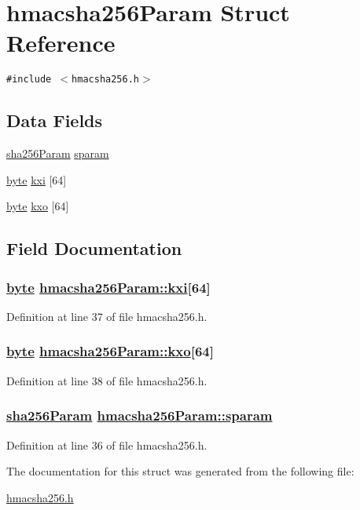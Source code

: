 \hypertarget{structhmacsha256Param}{
\section{hmacsha256Param Struct Reference}
\label{structhmacsha256Param}
}
{\tt \#include $<$hmacsha256.h$>$}

\subsection*{Data Fields}
\begin{CompactItemize}
\item 
\hyperlink{structsha256Param}{sha256Param} \hyperlink{structhmacsha256Param_o0}{sparam}
\item 
\hyperlink{beecrypt_8api_8h_a3}{byte} \hyperlink{structhmacsha256Param_o1}{kxi} \mbox{[}64\mbox{]}
\item 
\hyperlink{beecrypt_8api_8h_a3}{byte} \hyperlink{structhmacsha256Param_o2}{kxo} \mbox{[}64\mbox{]}
\end{CompactItemize}


\subsection{Field Documentation}
\hypertarget{structhmacsha256Param_o1}{
\subsubsection[kxi]{\setlength{\rightskip}{0pt plus 5cm}\hyperlink{beecrypt_8api_8h_a3}{byte} \hyperlink{structhmacsha256Param_o1}{hmacsha256Param::kxi}\mbox{[}64\mbox{]}}}
\label{structhmacsha256Param_o1}


Definition at line 37 of file hmacsha256.h.\hypertarget{structhmacsha256Param_o2}{
\subsubsection[kxo]{\setlength{\rightskip}{0pt plus 5cm}\hyperlink{beecrypt_8api_8h_a3}{byte} \hyperlink{structhmacsha256Param_o2}{hmacsha256Param::kxo}\mbox{[}64\mbox{]}}}
\label{structhmacsha256Param_o2}


Definition at line 38 of file hmacsha256.h.\hypertarget{structhmacsha256Param_o0}{
\subsubsection[sparam]{\setlength{\rightskip}{0pt plus 5cm}\hyperlink{structsha256Param}{sha256Param} \hyperlink{structhmacsha256Param_o0}{hmacsha256Param::sparam}}}
\label{structhmacsha256Param_o0}


Definition at line 36 of file hmacsha256.h.

The documentation for this struct was generated from the following file:\begin{CompactItemize}
\item 
\hyperlink{hmacsha256_8h}{hmacsha256.h}\end{CompactItemize}
